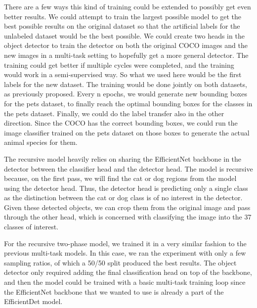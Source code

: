 There are a few ways this kind of training could be extended to possibly get even better results.
We could attempt to train the largest possible model to get the best possible results on the original dataset so that the artificial labels for the unlabeled dataset would be the best possible.
We could create two heads in the object detector to train the detector on both the original COCO images and the new images in a multi-task setting to hopefully get a more general detector.
The training could get better if multiple cycles were completed, and the training would work in a semi-supervised way.
So what we used here would be the first labels for the new dataset.
The training would be done jointly on both datasets, as previously proposed.
Every n epochs, we would generate new bounding boxes for the pets dataset, to finally reach the optimal bounding boxes for the classes in the pets dataset.
Finally, we could do the label transfer also in the other direction.
Since the COCO has the correct bounding boxes, we could run the image classifier trained on the pets dataset on those boxes to generate the actual animal species for them.

The recursive model heavily relies on sharing the EfficientNet backbone in the detector between the classifier head and the detector head.
The model is recursive because, on the first pass, we will find the cat or dog regions from the model using the detector head.
Thus, the detector head is predicting only a single class as the distinction between the cat or dog class is of no interest in the detector.
Given these detected objects, we can crop them from the original image and pass through the other head, which is concerned with classifying the image into the 37 classes of interest.

For the recursive two-phase model, we trained it in a very similar fashion to the previous multi-task models.
In this case, we ran the experiment with only a few sampling ratios, of which a 50/50 split produced the best results.
The object detector only required adding the final classification head on top of the backbone, and then the model could be trained with a basic multi-task training loop since the EfficientNet backbone that we wanted to use is already a part of the EfficientDet model.

